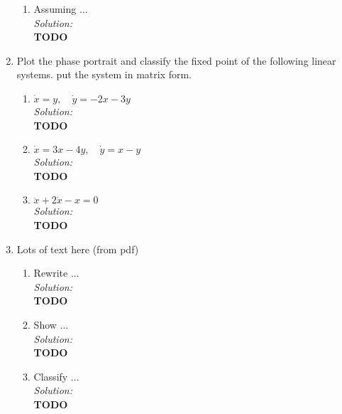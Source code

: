 \documentclass[10pt]{amsart}
\theoremstyle{nonumberplain}
\begin{document}
\begin{enumerate}[label={\bf {\arabic*}:}]
\begin{enumerate}
\item Assuming ... \\
\textit{Solution:} \\
\textbf{TODO} \\

\end{enumerate}

\newpage

\item Plot the phase portrait and classify the fixed point of the following linear systems. 
put the system in matrix form. \\

\begin{enumerate}

\item $\dot x = y, \quad \dot y = -2x - 3y$ \\
\textit{Solution:} \\
\textbf{TODO} \\

\item $\dot x = 3x - 4y, \quad \dot y = x - y$ \\
\textit{Solution:} \\
\textbf{TODO} \\

\item $\ddot x + 2\dot x - x = 0$ \\
\textit{Solution:} \\
\textbf{TODO} \\

\end{enumerate}

\newpage

\item Lots of text here (from pdf) \\

\begin{enumerate}

\item Rewrite ... \\
\textit{Solution:} \\
\textbf{TODO} \\

\item Show ... \\
\textit{Solution:} \\
\textbf{TODO} \\

\item Classify ... \\
\textit{Solution:} \\
\textbf{TODO} \\


\end{enumerate}
\end{enumerate}
\end{document}
